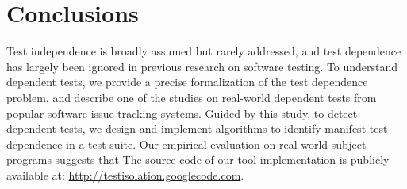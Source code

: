 \section{Conclusions}
\label{sec:questions}

Test independence is broadly assumed but rarely addressed, and
test dependence has largely been ignored in previous
research on software testing. To understand
dependent tests, we provide a
precise formalization of the test dependence problem,
and describe one of the studies on real-world dependent
tests from popular software issue tracking systems. Guided by
this study, to detect dependent tests, we design
and implement  algorithms to identify manifest test dependence
in a test suite. Our empirical evaluation on 
real-world subject programs suggests that 
The source code of our tool implementation is publicly
available at: \url{http://testisolation.googlecode.com}.
